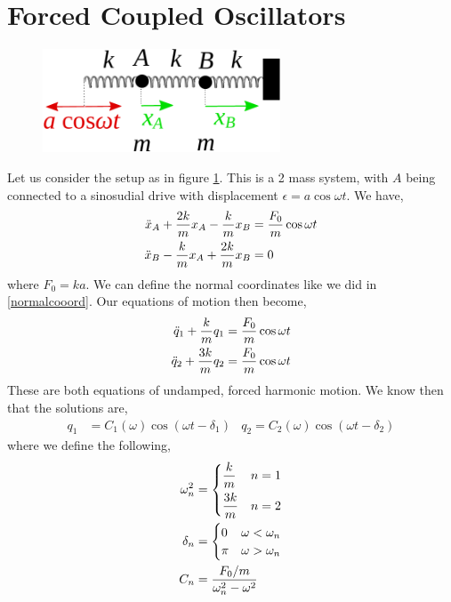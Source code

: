 \documentclass{book}
\begin{document}
\section{Forced Coupled Oscillators}
\begin{figure}
    \centering
    \includegraphics[width=200pt]{forcedcouple.pdf}
    \caption{}
    \label{fig:forcedcouple}
\end{figure}
Let us consider the setup as in figure \ref{fig:forcedcouple}. This is a 2 mass system, with $A$ being connected to a sinosudial drive with displacement $\epsilon = a\cos\omega t$. We have,
\begin{align}
    \Ddot{x}_A + \frac{2k}{m}x_A - \frac{k}{m}x_B & = \frac{F_0}{m}\cos\omega t \\
    \Ddot{x}_B - \frac{k}{m}x_A + \frac{2k}{m}x_B & = 0
\end{align}
where $F_0 = ka$. We can define the normal coordinates like we did in \eqref{normalcooord}. Our equations of motion then become, 
\begin{align}
    \Ddot{q}_1 + \frac{k}{m}q_1 & = \frac{F_0}{m}\cos\omega t \\
    \Ddot{q}_2 + \frac{3k}{m}q_2 & = \frac{F_0}{m}\cos\omega t
\end{align}
These are both equations of undamped, forced harmonic motion. We know then that the solutions are,
\begin{align}
    q_1 & = C_1(\omega)\cos(\omega t -\delta_1) & q_2 = C_2(\omega)\cos(\omega t - \delta_2)
\end{align}
where we define the following,
\begin{align}
    \omega^2_n & = \begin{dcases}
        \frac{k}{m} & n = 1 \\
        \frac{3k}{m} & n=2
    \end{dcases} \\
    \delta_n & = \begin{cases}
        0 & \omega < \omega_n \\
        \pi & \omega > \omega_n 
    \end{cases} \\
    C_n & = 
        \frac{F_0/m}{\omega_n^2 - \omega^2}
\end{align}
\end{document}
